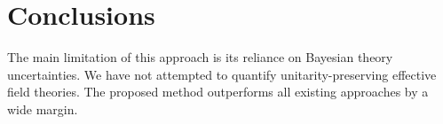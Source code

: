 \section{Conclusions}\label{sec:conclusions}

The main limitation of this approach is its reliance on Bayesian theory
uncertainties. We have not attempted to quantify unitarity-preserving
effective field theories. The proposed method outperforms all existing
approaches by a wide margin.

